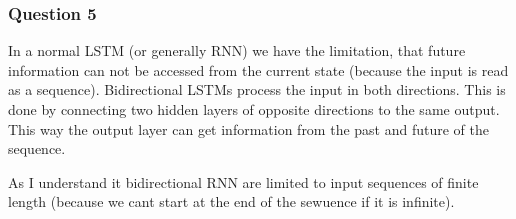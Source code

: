 \documentclass[10pt]{article}
\begin{document}
\subsubsection{Question 5}
In a normal LSTM (or generally RNN) we have the limitation, that future information can not be accessed from the current state (because the input is read as a sequence). Bidirectional LSTMs process the input in both directions. This is done by connecting two hidden layers of opposite directions to the same output. This way the output layer can get information from the past and future of the sequence.

As I understand it bidirectional RNN are limited to input sequences of finite length (because we cant start at the end of the sewuence if it is infinite).
\end{document}
